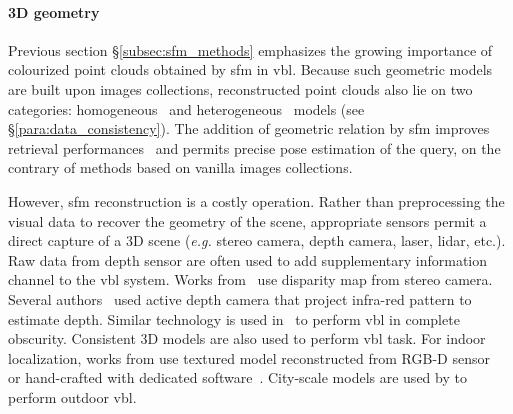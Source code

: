 		\paragraph{3D geometry}
        \label{subsubsec:3d_geometry}
			Previous section \S\ref{subsec:sfm_methods} emphasizes the growing importance of colourized point clouds obtained by \ac{sfm} in \ac{vbl}. Because such geometric models are built upon images collections, reconstructed point clouds also lie on two categories: homogeneous~\citep{Kendall2015,Kendall2016} and heterogeneous~\citep{Irschara2009,Sattler2011} models (see \S\ref{para:data_consistency}). The addition of geometric relation by \ac{sfm} improves retrieval performances~\citep{Sattler2012a} and permits precise pose estimation of the query, on the contrary of methods based on vanilla images collections.

			However, \ac{sfm} reconstruction is a costly operation. Rather than preprocessing the visual data to recover the geometry of the scene, appropriate sensors permit a direct capture of a 3D scene (\textit{e.g.} stereo camera, depth camera, laser, lidar, etc.). Raw data from depth sensor are often used to add supplementary information channel to the \ac{vbl} system. Works from~\citep{Ni2009,McManus2014,Wan2014} use disparity map from stereo camera. Several authors~\citep{Shotton2013,Guzman-rivera2014,Glocker2015} used active depth camera that project infra-red pattern to estimate depth. Similar technology is used in~\citep{Li2016a} to perform \ac{vbl} in complete obscurity. Consistent 3D models are also used to perform \ac{vbl} task. For indoor localization, works from \citep{Shotton2013,Pascoe2015} use textured model reconstructed from RGB-D sensor~\citep{Shotton2013} or hand-crafted with dedicated software~\citep{Pascoe2015}. City-scale models are used by \citep{Aubry2014,Poglitsch2015,Pascoe2015a,Pascoe2015b,Caselitz2016} to perform outdoor \ac{vbl}. 

	

